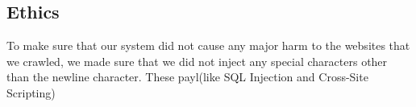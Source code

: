 \subsection{Ethics}
To make sure that our system did not cause any major harm to the websites that we crawled, we made sure that we did not inject any special characters other than the newline character. These payl(like SQL Injection and Cross-Site Scripting)